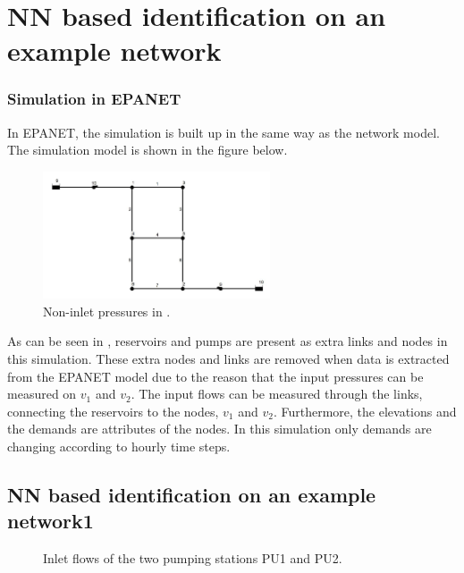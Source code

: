 \chapter{NN based identification on an example network}
\label{NN_based_example}

\subsection{Simulation in EPANET}
\label{example1_EPANET}

In EPANET, the simulation is built up in the same way as the network model. The simulation model is shown in the figure below. 

\begin{figure}[H]
\centering
\includegraphics[width=0.6\textwidth]{report/pictures/example1_epanetmodel}
% 
\caption{Non-inlet pressures in .}
\label{fig:epanet_example1}
\end{figure}

As can be seen in , reservoirs and pumps are present as extra links and nodes in this simulation. These extra nodes and links are removed when data is extracted from the EPANET model due to the reason that the input pressures can be measured on $v_1$ and $v_2$. The input flows can be measured through the links, connecting the reservoirs to the nodes, $v_1$ and $v_2$. Furthermore, the elevations and the demands are attributes of the nodes. In this simulation only demands are changing according to hourly time steps. 


\section{NN based identification on an example network1}
\label{NN_based_example1} 

 \begin{figure}[H]
 \centering
  
 \vspace{-1.5mm}
 \caption{Inlet flows of the two pumping stations PU1 and PU2.}
 \label{fig:inlet_flows_example1}
 \end{figure}

